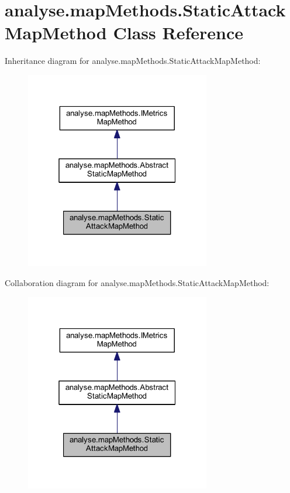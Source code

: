 \hypertarget{classanalyse_1_1map_methods_1_1_static_attack_map_method}{}\section{analyse.\+map\+Methods.\+Static\+Attack\+Map\+Method Class Reference}
\label{classanalyse_1_1map_methods_1_1_static_attack_map_method}


Inheritance diagram for analyse.\+map\+Methods.\+Static\+Attack\+Map\+Method\+:
\nopagebreak
\begin{figure}[H]
\begin{center}
\leavevmode
\includegraphics[width=229pt]{classanalyse_1_1map_methods_1_1_static_attack_map_method__inherit__graph}
\end{center}
\end{figure}


Collaboration diagram for analyse.\+map\+Methods.\+Static\+Attack\+Map\+Method\+:
\nopagebreak
\begin{figure}[H]
\begin{center}
\leavevmode
\includegraphics[width=229pt]{classanalyse_1_1map_methods_1_1_static_attack_map_method__coll__graph}
\end{center}
\end{figure}
